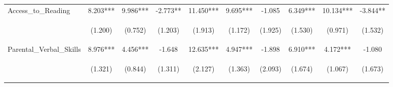 \begin{tabular}{lccccccccc}
\noalign{\smallskip}Access_to_Reading & 8.203*** & 9.986*** & -2.773** & 11.450*** & 9.695*** & -1.085 & 6.349*** & 10.134*** & -3.844**\\
 & \begin{footnotesize}(1.200)\end{footnotesize} & \begin{footnotesize}(0.752)\end{footnotesize} & \begin{footnotesize}(1.203)\end{footnotesize} & \begin{footnotesize}(1.913)\end{footnotesize} & \begin{footnotesize}(1.172)\end{footnotesize} & \begin{footnotesize}(1.925)\end{footnotesize} & \begin{footnotesize}(1.530)\end{footnotesize} & \begin{footnotesize}(0.971)\end{footnotesize} & \begin{footnotesize}(1.532)\end{footnotesize}\\
\noalign{\smallskip}Parental_Verbal_Skills & 8.976*** & 4.456*** & -1.648 & 12.635*** & 4.947*** & -1.898 & 6.910*** & 4.172*** & -1.080\\
 & \begin{footnotesize}(1.321)\end{footnotesize} & \begin{footnotesize}(0.844)\end{footnotesize} & \begin{footnotesize}(1.311)\end{footnotesize} & \begin{footnotesize}(2.127)\end{footnotesize} & \begin{footnotesize}(1.363)\end{footnotesize} & \begin{footnotesize}(2.093)\end{footnotesize} & \begin{footnotesize}(1.674)\end{footnotesize} & \begin{footnotesize}(1.067)\end{footnotesize} & \begin{footnotesize}(1.673)\end{footnotesize}\\

\end{tabular}
